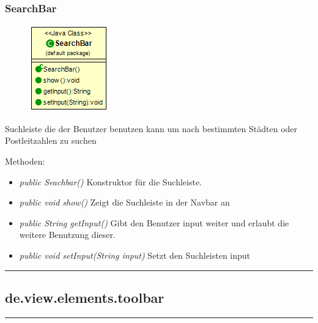 \subsubsection{SearchBar}
\begin{minipage}{0.3\textwidth}
    \begin{figure}[H]
        {\centering\includegraphics[scale = 0.65]{media/view/navbar/Searchbar_Class.png}}
    \end{figure}
    \end{minipage} \hfill
    \begin{minipage}{0.6\textwidth}
Suchleiste die der Benutzer benutzen kann um nach bestimmten Städten oder Postleitzahlen zu suchen
\end{minipage}
\vspace{\baselineskip}
Methoden: \begin{itemize} [noitemsep]
    \item \emph{public Seachbar()} Konstruktor für die Suchleiste.
    \item \emph{public void show()}  Zeigt die Suchleiste in der Navbar an
    \item \emph{public String getInput()} Gibt den Benutzer input weiter und erlaubt die weitere Benutzung dieser.
    \item \emph{public void setInput(String input)} Setzt den Suchleisten input
\end{itemize}

\rule{\textwidth}{0.4pt}
\subsection{de.view.elements.toolbar}

\rule{\textwidth}{0.4pt}
